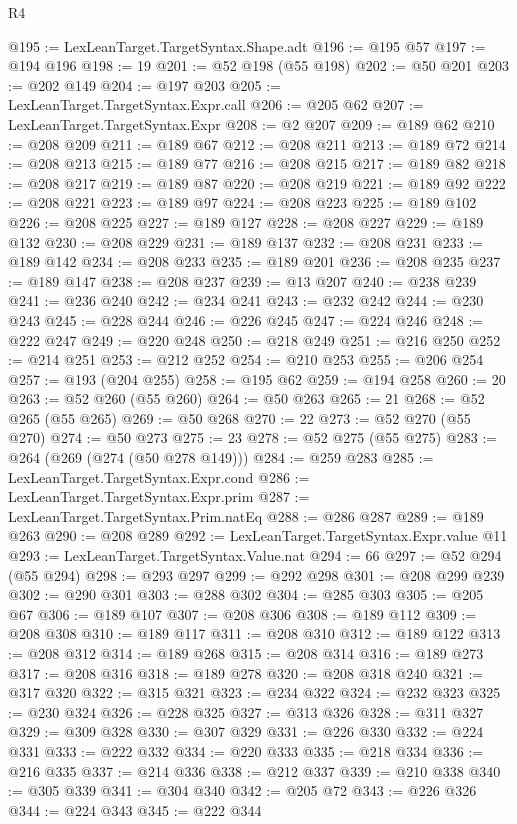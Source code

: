 \begin{lexlean}{R4}
\begin{coremodule}
@195 := LexLeanTarget.TargetSyntax.Shape.adt
@196 := @195 @57
@197 := @194 @196
@198 := 19
@201 := @52 @198 (@55 @198)
@202 := @50 @201
@203 := @202 @149
@204 := @197 @203
@205 := LexLeanTarget.TargetSyntax.Expr.call
@206 := @205 @62
@207 := LexLeanTarget.TargetSyntax.Expr
@208 := @2 @207
@209 := @189 @62
@210 := @208 @209
@211 := @189 @67
@212 := @208 @211
@213 := @189 @72
@214 := @208 @213
@215 := @189 @77
@216 := @208 @215
@217 := @189 @82
@218 := @208 @217
@219 := @189 @87
@220 := @208 @219
@221 := @189 @92
@222 := @208 @221
@223 := @189 @97
@224 := @208 @223
@225 := @189 @102
@226 := @208 @225
@227 := @189 @127
@228 := @208 @227
@229 := @189 @132
@230 := @208 @229
@231 := @189 @137
@232 := @208 @231
@233 := @189 @142
@234 := @208 @233
@235 := @189 @201
@236 := @208 @235
@237 := @189 @147
@238 := @208 @237
@239 := @13 @207
@240 := @238 @239
@241 := @236 @240
@242 := @234 @241
@243 := @232 @242
@244 := @230 @243
@245 := @228 @244
@246 := @226 @245
@247 := @224 @246
@248 := @222 @247
@249 := @220 @248
@250 := @218 @249
@251 := @216 @250
@252 := @214 @251
@253 := @212 @252
@254 := @210 @253
@255 := @206 @254
@257 := @193 (@204 @255)
@258 := @195 @62
@259 := @194 @258
@260 := 20
@263 := @52 @260 (@55 @260)
@264 := @50 @263
@265 := 21
@268 := @52 @265 (@55 @265)
@269 := @50 @268
@270 := 22
@273 := @52 @270 (@55 @270)
@274 := @50 @273
@275 := 23
@278 := @52 @275 (@55 @275)
@283 := @264 (@269 (@274 (@50 @278 @149)))
@284 := @259 @283
@285 := LexLeanTarget.TargetSyntax.Expr.cond
@286 := LexLeanTarget.TargetSyntax.Expr.prim
@287 := LexLeanTarget.TargetSyntax.Prim.natEq
@288 := @286 @287
@289 := @189 @263
@290 := @208 @289
@292 := LexLeanTarget.TargetSyntax.Expr.value @11
@293 := LexLeanTarget.TargetSyntax.Value.nat
@294 := 66
@297 := @52 @294 (@55 @294)
@298 := @293 @297
@299 := @292 @298
@301 := @208 @299 @239
@302 := @290 @301
@303 := @288 @302
@304 := @285 @303
@305 := @205 @67
@306 := @189 @107
@307 := @208 @306
@308 := @189 @112
@309 := @208 @308
@310 := @189 @117
@311 := @208 @310
@312 := @189 @122
@313 := @208 @312
@314 := @189 @268
@315 := @208 @314
@316 := @189 @273
@317 := @208 @316
@318 := @189 @278
@320 := @208 @318 @240
@321 := @317 @320
@322 := @315 @321
@323 := @234 @322
@324 := @232 @323
@325 := @230 @324
@326 := @228 @325
@327 := @313 @326
@328 := @311 @327
@329 := @309 @328
@330 := @307 @329
@331 := @226 @330
@332 := @224 @331
@333 := @222 @332
@334 := @220 @333
@335 := @218 @334
@336 := @216 @335
@337 := @214 @336
@338 := @212 @337
@339 := @210 @338
@340 := @305 @339
@341 := @304 @340
@342 := @205 @72
@343 := @226 @326
@344 := @224 @343
@345 := @222 @344

\end{coremodule}
\end{lexlean}
